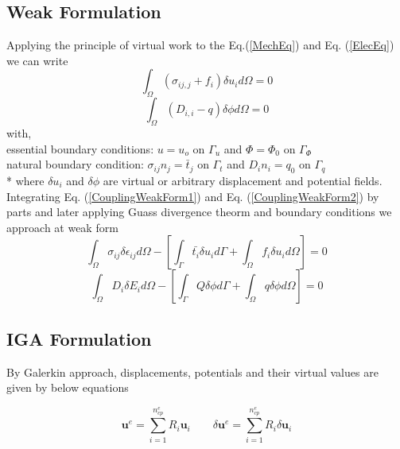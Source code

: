 \documentclass[11pt]{article}
\begin{document}
\subsection{Weak Formulation}
Applying the principle of virtual work to the Eq.(\ref{MechEq})
and Eq. (\ref{ElecEq}) we can write \cite{nguyen2018finite}
\begin{equation} \label{CouplingWeakForm1}
\int_\Omega ( \sigma_{ij,j} + f_i ) \delta u_i d\Omega = 0  
\end{equation}
\begin{equation} \label{CouplingWeakForm2}
\int_\Omega (D_{i,i} - q ) \delta \phi d\Omega = 0
\end{equation}
with, \\
essential boundary conditions:
$u = u_o$ on $\Gamma_u$ and $\Phi=\Phi_0$ on $\Gamma_\Phi$ \\
natural boundary condition:
$\sigma_{ij}n_j = \bar{t}_j$ on $\Gamma_t$ and $D_i n_i = q_0$ on $\Gamma_q$ \\*
where $\delta u_i$ and $\delta \phi$ are virtual or arbitrary displacement and
potential fields. \\
Integrating Eq. (\ref{CouplingWeakForm1}) and Eq. (\ref{CouplingWeakForm2}) by
parts and later applying Guass divergence theorm and boundary conditions we
approach at weak form
\begin{equation} \label{FinalCouplingWeakForm1}
\int_\Omega \sigma_{ij} \delta \epsilon_{ij} d\Omega - \left[ \int_{\Gamma}
\bar{t_i} \delta u_i d\Gamma + \int_\Omega f_i \delta u_i d\Omega  \right]= 0 
\end{equation}
\begin{equation} \label{FinalCouplingWeakForm2}
\int_\Omega D_i \delta E_i d\Omega - \left[ \int_{\Gamma} Q \delta \phi d\Gamma
+ \int_\Omega q \delta \phi d\Omega \right] = 0
\end{equation}


\subsection{IGA Formulation}
By Galerkin approach, displacements, potentials and their virtual values are
given by below equations \cite{agrawal2019iga}

\begin{equation} \label{u_and_du_2}
\textbf{u}^e = \sum_{i=1}^{n_{cp}^e} R_i \textbf{u}_i \qquad \delta\textbf{u}^e
= \sum_{i=1}^{n_{cp}^e} R_i \delta\textbf{u}_i
\end{equation}
\end{document}
